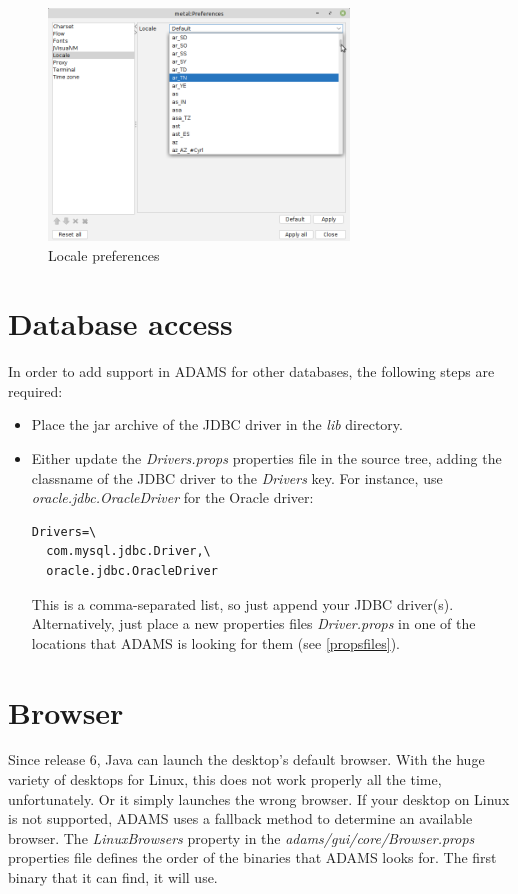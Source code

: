 \begin{figure}[htb]
  \centering
  \includegraphics[width=8.0cm]{images/locale_setup.png}
  \caption{Locale preferences}
  \label{locale_setup}
\end{figure}


\section{Database access}
\label{databaseaccess}
In order to add support in ADAMS for other databases, the following steps
are required:
\begin{itemize}
	\item Place the jar archive of the JDBC driver in the \textit{lib} directory.
	\item Either update the \textit{Drivers.props} properties file in the source
	tree, adding the classname of the JDBC driver to the \textit{Drivers} key. For instance,
	use \textit{oracle.jdbc.OracleDriver} for the Oracle driver: \\
\begin{verbatim}
Drivers=\
  com.mysql.jdbc.Driver,\
  oracle.jdbc.OracleDriver
\end{verbatim}
	This is a comma-separated list, so just append your JDBC driver(s). \\
	Alternatively, just place a new properties files \textit{Driver.props}
	in one of the locations that ADAMS is looking for them (see \ref{propsfiles}).
\end{itemize}

\section{Browser}
Since release 6, Java can launch the desktop's default browser. With the huge
variety of desktops for Linux, this does not work properly all the time, 
unfortunately. Or it simply launches the wrong browser. If your desktop on 
Linux is not supported, ADAMS uses a fallback method to determine an available browser. 
The \textit{LinuxBrowsers} property in the \textit{adams/gui/core/Browser.props} 
properties file defines the order of the binaries that ADAMS looks for. The first
binary that it can find, it will use.

